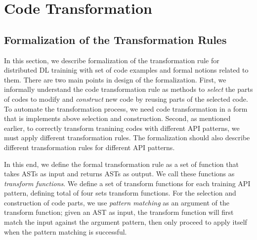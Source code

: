 \section{Code Transformation}\label{sec:trans}

\subsection{Formalization of the Transformation Rules}

In this section, we describe formalization of the transformation rule
for distributed DL traininig with set of code examples and formal notions
related to them.
There are two main points in design of the formalization.
First, we informally understand the code transformation rule as methods to
\textit{select} the parts of codes to modify and \textit{construct} new code by 
reusing parts of the selected code.
To automate the transformation process, we need code transformation in a form 
that is implements above selection and construction.
Second, as mentioned earlier, to correctly transform tranining codes with different
API patterns, we must apply different transformation rules.
The formalization should also describe different transformation rules
for different API patterns.

In this end, we define the formal transformation rule as a set of
function that takes ASTs as input and returns ASTs as output.
We call these functions as \textit{transform functions}.
We define a set of transform functions for each training API pattern,
defining total of four sets transform functions.
For the selection and construction of code parts,
we use \textit{pattern matching} as an argument of the transform function;
given an AST as input, the transform function will first match the
input against the argument pattern, then only proceed to apply itself
when the pattern matching is successful.

